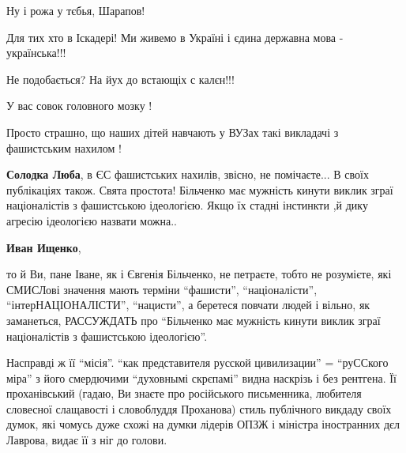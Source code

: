 \begin{itemize}
 
Ну і рожа у тєбья, Шарапов!

Для тих хто в Іскадері! Ми живемо в Україні і єдина державна мова -
українська!!!

Не подобається? На йух до встающіх с калєн!!!


 

У вас совок головного мозку !

Просто страшно, що наших дітей навчають у ВУЗах такі викладачі з фашистським нахилом !

\begin{itemize}
 
\textbf{Солодка Люба}, в ЄС фашистських нахилів, звісно, не помічаєте... В
своїх публікаціях також. Свята простота! Більченко має мужність кинути виклик
зграї націоналістів з фашистською ідеологією. Якщо їх стадні інстинкти ,й дику
агресію ідеологією назвати можна..


 
\textbf{Иван Ищенко}, 

то й Ви, пане Іване, як і Євгенія Більченко, не петраєте, тобто не розумієте,
які СМИСЛові значення мають терміни \enquote{фашисти}, \enquote{націоналісти},
\enquote{інтерНАЦІОНАЛІСТИ}, \enquote{нацисти}, а беретеся повчати людей і вільно, як
заманеться, РАССУЖДАТЬ про \enquote{Більченко має мужність кинути виклик зграї
націоналістів з фашистською ідеологією}. 

Насправді ж її \enquote{місія}. \enquote{как представителя русской цивилизации}
= \enquote{руССкого міра} з його смердючими \enquote{духовнымі скрєпамі} видна
наскрізь і без рентгена. Її проханівський (гадаю, Ви знаєте про російського
письменника, любителя словесної слащавості і словоблуддя Проханова) стиль
публічного викдаду своїх думок, які чомусь дуже схожі на думки лідерів ОПЗЖ і
міністра іностранних дєл Лаврова, видає її з ніг до голови. 


\end{itemize}
\end{itemize}
